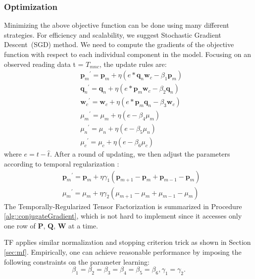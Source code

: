 \subsubsection{Optimization}
Minimizing the above objective function can be done using many different strategies.
For efficiency and scalability, we suggest Stochastic Gradient Descent~(SGD) method.
We need to compute the gradients of the objective function with respect to each individual component in the model.
Focusing on an observed reading data t = $T_{mnc} $, the update rules are:
\begin{equation*}
\begin{aligned}
&{\mathbf{p}_m}^\prime={\mathbf{p}_m}+\eta(e*\mathbf{q}_n \mathbf{w}_c - \beta_1 \mathbf{p}_m)
\\&{\mathbf{q}_n}^\prime={\mathbf{q}_n}+\eta(e*\mathbf{p}_m \mathbf{w}_c - \beta_2 \mathbf{q}_n)
\\&{\mathbf{w}_c}^\prime={\mathbf{w}_c}+\eta(e*\mathbf{p}_m \mathbf{q}_n - \beta_3 \mathbf{w}_c)
\\&{\mu_m}^\prime=\mu_m+\eta(e-\beta_4\mu_m)
\\&{\mu_n}^\prime=\mu_n+\eta(e-\beta_5\mu_n)
\\&{\mu_c}^\prime=\mu_c+\eta(e-\beta_6\mu_c)
\end{aligned}
\end{equation*}
where $e=t-\hat{t}$. After a round of updating, we then adjust the parameters according to temporal regularization :
\begin{equation*}
\begin{aligned}
&{\mathbf{p}_m}^\prime={\mathbf{p}_m}+\eta\gamma_1(\mathbf{p}_{m+1}-\mathbf{p}_m+\mathbf{p}_{m-1}-\mathbf{p}_m)
\\&{\mu_m}^\prime=\mu_m+\eta\gamma_2(\mu_{m+1}-\mu_m+\mu_{m-1}-\mu_m)
\end{aligned}
\end{equation*}
The Temporally-Regularized Tensor Factorization is summarized in Procedure \ref{alg::conjugateGradient}, which is not hard to implement since it accesses only one row of $\mathbf{P}$, $\mathbf{Q}$, $\mathbf{W}$ at a time.

TF applies similar normalization and stopping criterion trick as shown in Section \ref{sec:mf}.
Empirically, one can achieve reasonable performance by imposing the following constraints on the parameter learning:  
\begin{equation*}
\beta_1=\beta_2=\beta_3=\beta_4=\beta_5=\beta_6, \gamma_1=\gamma_2.
\end{equation*}

